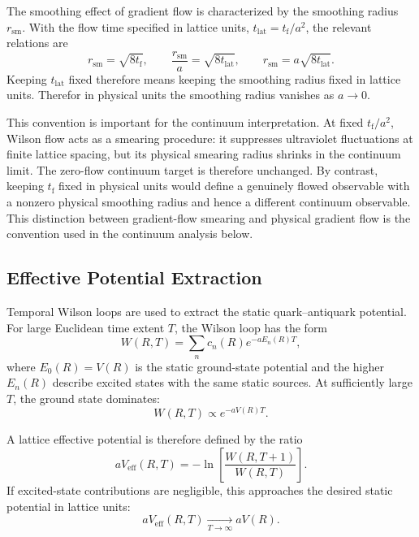 \documentclass[12pt,a4paper,oneside,numbers=noenddot]{scrreprt}
\newcommand{\latspacing}{a}
\begin{document}
The smoothing effect of gradient flow is characterized by the smoothing radius
\(r_{\mathrm{sm}}\). With the flow time specified in lattice units,
\(t_{\mathrm{lat}}=t_{\mathrm f}/\latspacing^2\), the relevant relations are
\begin{equation}
  r_{\mathrm{sm}}
  =
  \sqrt{8t_{\mathrm f}},
  \qquad
  \frac{r_{\mathrm{sm}}}{\latspacing}
  =
  \sqrt{8t_{\mathrm{lat}}},
  \qquad
  r_{\mathrm{sm}}
  =
  \latspacing\sqrt{8t_{\mathrm{lat}}}.
  \label{eq:flow-smoothing-radius}
\end{equation}
Keeping \(t_{\mathrm{lat}}\) fixed therefore means keeping the smoothing radius
fixed in lattice units. Therefor in physical units the smoothing radius vanishes as
\(\latspacing\to0\).

This convention is important for the continuum interpretation. At fixed
\(t_{\mathrm f}/\latspacing^2\), Wilson flow acts as a smearing procedure: it
suppresses ultraviolet fluctuations at finite lattice spacing, but its physical
smearing radius shrinks in the continuum limit. The zero-flow continuum target
is therefore unchanged. By contrast, keeping \(t_{\mathrm f}\) fixed in physical
units would define a genuinely flowed observable with a nonzero physical
smoothing radius and hence a different continuum observable. This distinction
between gradient-flow smearing and physical gradient flow is the convention
used in the continuum analysis below.

\subsection{Effective Potential Extraction}
\label{subsec:effective-potential-extraction}

Temporal Wilson loops are used to extract the static quark--antiquark potential.
For large Euclidean time extent $T$, the Wilson loop has the form
\begin{equation}
  W(R,T)
  =
  \sum_n c_n(R) e^{-a E_n(R) T},
  \label{eq:wilson-loop-spectral-decomposition}
\end{equation}
where $E_0(R)=V(R)$ is the static ground-state potential and the higher
$E_n(R)$ describe excited states with the same static sources. At sufficiently
large $T$, the ground state dominates:
\begin{equation}
  W(R,T)
  \propto
  e^{-a V(R) T}.
\end{equation}

A lattice effective potential is therefore defined by the ratio
\begin{equation}
  a V_{\mathrm{eff}}(R,T)
  =
  -
  \ln
  \left[
    \frac{W(R,T+1)}{W(R,T)}
  \right].
  \label{eq:effective-potential-ratio}
\end{equation}
If excited-state contributions are negligible, this approaches the desired
static potential in lattice units:
\begin{equation}
  a V_{\mathrm{eff}}(R,T)
  \xrightarrow[T\to\infty]{}
  a V(R).
\end{equation}
\end{document}
